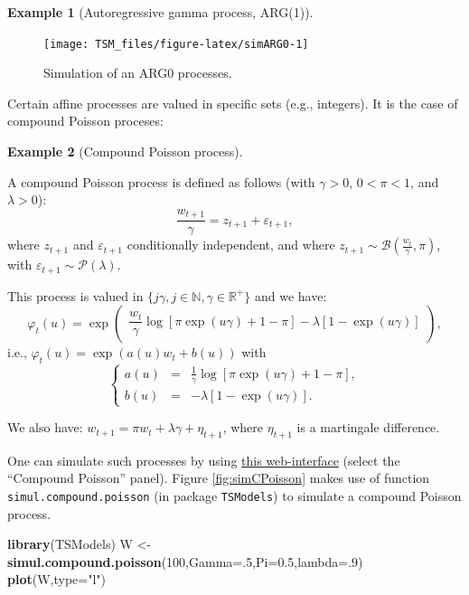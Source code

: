 \documentclass[
  12pt,
]{book}
\newenvironment{Shaded}{\begin{snugshade}}{\end{snugshade}}
\newcommand{\AttributeTok}[1]{\textcolor[rgb]{0.13,0.29,0.53}{#1}}
\newcommand{\DecValTok}[1]{\textcolor[rgb]{0.00,0.00,0.81}{#1}}
\newcommand{\FloatTok}[1]{\textcolor[rgb]{0.00,0.00,0.81}{#1}}
\newcommand{\FunctionTok}[1]{\textcolor[rgb]{0.13,0.29,0.53}{\textbf{#1}}}
\newcommand{\NormalTok}[1]{#1}
\newcommand{\OtherTok}[1]{\textcolor[rgb]{0.56,0.35,0.01}{#1}}
\newcommand{\StringTok}[1]{\textcolor[rgb]{0.31,0.60,0.02}{#1}}
\theoremstyle{definition}
\theoremstyle{definition}
\newtheorem{example}{Example}[chapter]
\theoremstyle{definition}
\theoremstyle{definition}
\theoremstyle{remark}
\begin{document}
\begin{example}[Autoregressive gamma process, ARG(1)]
\begin{figure}
\texttt{[image: TSM\_files/figure-latex/simARG0-1]} \caption{Simulation of an ARG0 processes.}\label{fig:simARG0}
\end{figure}

\end{example}

Certain affine processes are valued in specific sets (e.g., integers). It is the case of compound Poisson proceses:

\begin{example}[Compound Poisson process]
\protect\hypertarget{exm:CompoundPoisson}{}\label{exm:CompoundPoisson}

A compound Poisson process is defined as follows (with \(\gamma > 0\), \(0 < \pi< 1\), and \(\lambda > 0\)):
\[
\frac{w_{t+1}}{\gamma} = z_{t+1} + \varepsilon_{t+1},
\]
where \(z_{t+1}\) and \(\varepsilon_{t+1}\) conditionally independent, and where
\(z_{t+1} \sim {\mathcal B} \left(\frac{w_t}{\gamma},\pi\right)\), with \(\varepsilon_{t+1} \sim {\mathcal P}(\lambda)\).

This process is valued in \(\{j \gamma, j \in \mathbb{N}, \gamma \in \mathbb{R}^+\}\) and we have:
\[
\varphi_t(u) = \exp\left(
\begin{array}{l}
\dfrac{w_t}{\gamma}   \log[\pi
\exp(u\gamma)+1-\pi]-\lambda[1-\exp(u \gamma)]
\end{array}
\right),
\]
i.e., \(\varphi_t(u) = \exp\left(a(u)w_t+b(u)\right)\) with
\[
\left\{
\begin{array}{ccl}
a(u)&=& \frac{1}{\gamma}   \log[\pi   \exp(u
\gamma)+1-\pi],\\
b(u) &=& -\lambda[1-\exp(u \gamma)].
\end{array}
\right.
\]

We also have: \(w_{t+1} = \pi w_t + \lambda \gamma + \eta_{t+1}\), where \(\eta_{t+1}\) is a
martingale difference.

One can simulate such processes by using \href{https://jrenne.shinyapps.io/Affine/}{this web-interface} (select the ``Compound Poisson'' panel). Figure \ref{fig:simCPoisson} makes use of function \texttt{simul.compound.poisson} (in package \texttt{TSModels}) to simulate a compound Poisson process.

\begin{Shaded}
\begin{Highlighting}[]
\FunctionTok{library}\NormalTok{(TSModels)}
\NormalTok{W }\OtherTok{\textless{}{-}} \FunctionTok{simul.compound.poisson}\NormalTok{(}\DecValTok{100}\NormalTok{,}\AttributeTok{Gamma=}\NormalTok{.}\DecValTok{5}\NormalTok{,}\AttributeTok{Pi=}\FloatTok{0.5}\NormalTok{,}\AttributeTok{lambda=}\NormalTok{.}\DecValTok{9}\NormalTok{)}
\FunctionTok{plot}\NormalTok{(W,}\AttributeTok{type=}\StringTok{"l"}\NormalTok{)}
\end{Highlighting}
\end{Shaded}


\end{example}
\end{document}
